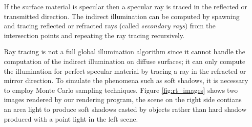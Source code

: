 If the surface material is specular then a specular ray is traced in the reflected or transmitted direction. The indirect illumination can be computed by spawning and tracing reflected or refracted rays (called \emph{secondary rays}) from the intersection points and repeating the ray tracing recursively.

Ray tracing is not a full global illumination algorithm since it cannot handle the computation of the indirect illumination on diffuse surfaces; it can only compute the illumination for perfect specular material by tracing a ray in the refracted or mirror direction. To simulate the phenomena such as soft shadows, it is necessary to employ Monte Carlo sampling techniques\cite{Kajiya:1986:RE:15922.15902}. Figure \ref{fig:rt_images} shows two images rendered by our rendering program, the scene on the right side contians an area light to produce soft shadows casted by objects rather than hard shadow produced with a point light in the left scene. 

